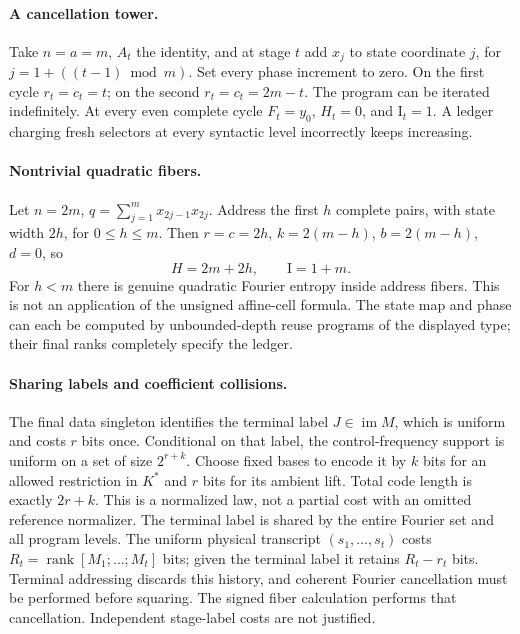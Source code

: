 \documentclass[11pt]{article}
\newcommand{\I}{\mathrm I}
\newcommand{\rk}{\operatorname{rank}}
\begin{document}
\paragraph{A cancellation tower.}
Take $n=a=m$, $A_t$ the identity, and at stage $t$ add $x_j$ to state
coordinate $j$, for $j=1+((t-1)\bmod m)$. Set every phase increment
to zero. On the first cycle $r_t=c_t=t$; on the second
$r_t=c_t=2m-t$. The program can be iterated indefinitely. At every
even complete cycle $F_t=y_0$, $H_t=0$, and $\I_t=1$. A ledger charging
fresh selectors at every syntactic level incorrectly keeps increasing.

\paragraph{Nontrivial quadratic fibers.}
Let $n=2m$, $q=\sum_{j=1}^m x_{2j-1}x_{2j}$. Address the first $h$
complete pairs, with state width $2h$, for $0\le h\le m$. Then
$r=c=2h$, $k=2(m-h)$, $b=2(m-h)$, $d=0$, so
\[
 H=2m+2h,\qquad \I=1+m.
\]
For $h<m$ there is genuine quadratic Fourier entropy inside address
fibers. This is not an application of the unsigned affine-cell formula.
The state map and phase can each be computed by unbounded-depth reuse
programs of the displayed type; their final ranks completely specify
the ledger.

\paragraph{Sharing labels and coefficient collisions.}
The final data singleton identifies the terminal label $J\in\operatorname{im}M$,
which is uniform and costs $r$ bits once. Conditional on that label,
the control-frequency support is uniform on a set of size $2^{r+k}$.
Choose fixed bases to encode it by $k$ bits for an allowed restriction
in $K^*$ and $r$ bits for its ambient lift. Total code length is exactly
$2r+k$. This is a normalized law, not a partial cost with an omitted
reference normalizer. The terminal label is shared by the entire Fourier
set and all program levels. The uniform physical transcript
$(s_1,\ldots,s_t)$ costs $R_t=\rk [M_1;\ldots;M_t]$ bits; given the
terminal label it retains $R_t-r_t$ bits. Terminal addressing discards
this history, and coherent Fourier cancellation must be performed
before squaring. The signed fiber calculation performs that cancellation.
Independent stage-label costs are not justified.
\end{document}
